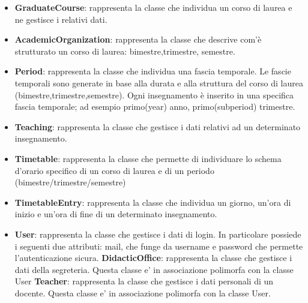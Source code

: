 \documentclass[11pt,a4paper]{article}
\begin{document}
\begin{itemize}
\item \textbf{GraduateCourse}: rappresenta la classe che individua un corso di laurea e ne gestisce i relativi dati.

\item \textbf{AcademicOrganization}: rappresenta la classe che descrive com'è strutturato un corso di laurea: bimestre,trimestre, semestre.

\item \textbf{Period}: rappresenta la classe che individua una fascia temporale. 
Le fascie temporali sono generate in base alla durata e alla struttura del corso di laurea (bimestre,trimestre,semestre). Ogni insegnamento è inserito in una specifica fascia temporale; ad esempio primo(year) anno, primo(subperiod) trimestre. 

\item \textbf{Teaching}: rappresenta la classe che gestisce i dati relativi ad un determinato insegnamento.

\item \textbf{Timetable}: rappresenta la classe che permette di individuare lo schema d'orario specifico di un corso di laurea e di un periodo (bimestre/trimestre/semestre) 

\item \textbf{TimetableEntry}: rappresenta la classe che individua un giorno, un'ora di inizio e un'ora di fine di un determinato insegnamento.

\item \textbf{User}: rappresenta la classe che gestisce i dati di login. In particolare possiede i seguenti due attributi: mail, che funge da username e password che permette l'autenticazione sicura.
\subitem \textbf{DidacticOffice}: rappresenta la classe che gestisce i dati della segreteria. 
Questa classe e' in associazione polimorfa con la classe User 
\subitem \textbf{Teacher}: rappresenta la classe che gestisce i dati personali di un docente.
Questa classe e' in associazione polimorfa con la classe User. 
\end{itemize}

\newpage
\end{document}
